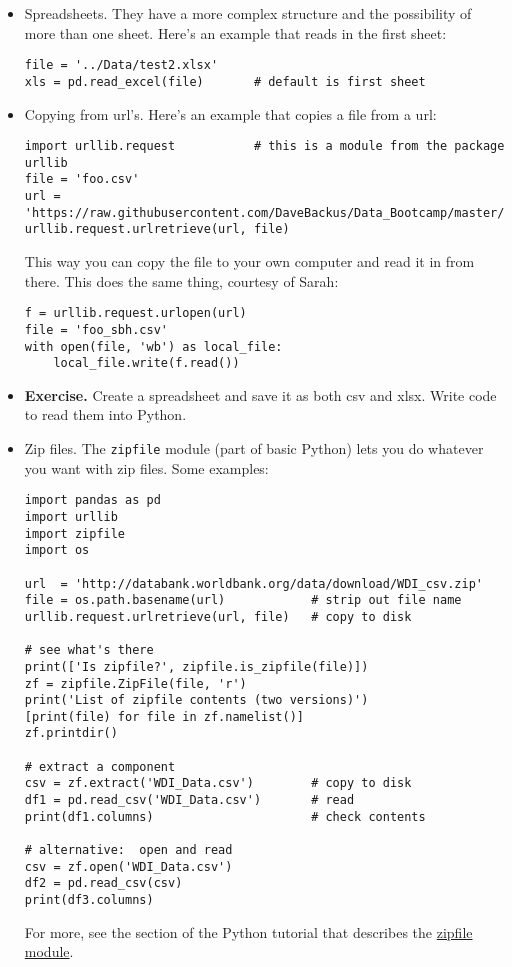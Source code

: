 \documentclass[11pt]{article}
\begin{document}
\begin{itemize}
\item Spreadsheets.  They have a more complex structure and the possibility
of more than one sheet.
Here's an example that reads in the first sheet:
\begin{verbatim}
file = '../Data/test2.xlsx'
xls = pd.read_excel(file)       # default is first sheet
\end{verbatim}


\item Copying from url's.
Here's an example that copies a file from a url:
\begin{verbatim}
import urllib.request           # this is a module from the package urllib
file = 'foo.csv'
url = 'https://raw.githubusercontent.com/DaveBackus/Data_Bootcamp/master/Code/Data/test1.csv'
urllib.request.urlretrieve(url, file)
\end{verbatim}
This way you can copy the file to your own computer and read it in from there.
This does the same thing, courtesy of Sarah:
\begin{verbatim}
f = urllib.request.urlopen(url)
file = 'foo_sbh.csv'
with open(file, 'wb') as local_file:
    local_file.write(f.read())
\end{verbatim}

\item {\bf Exercise.}  Create a spreadsheet and save it as both csv and xlsx.
Write code to read them into Python.


\item Zip files.  The {\tt zipfile} module (part of basic Python)
lets you do whatever you want with zip files.
Some examples:
\begin{verbatim}
import pandas as pd
import urllib
import zipfile
import os

url  = 'http://databank.worldbank.org/data/download/WDI_csv.zip'
file = os.path.basename(url)            # strip out file name
urllib.request.urlretrieve(url, file)   # copy to disk

# see what's there
print(['Is zipfile?', zipfile.is_zipfile(file)])
zf = zipfile.ZipFile(file, 'r')
print('List of zipfile contents (two versions)')
[print(file) for file in zf.namelist()]
zf.printdir()

# extract a component
csv = zf.extract('WDI_Data.csv')        # copy to disk
df1 = pd.read_csv('WDI_Data.csv')       # read
print(df1.columns)                      # check contents

# alternative:  open and read
csv = zf.open('WDI_Data.csv')
df2 = pd.read_csv(csv)
print(df3.columns)
\end{verbatim}
For more, see the section of the Python tutorial that describes the
\href{https://docs.python.org/3.4/library/zipfile.html#module-zipfile}{zipfile module}.

\end{itemize}
\end{document}
